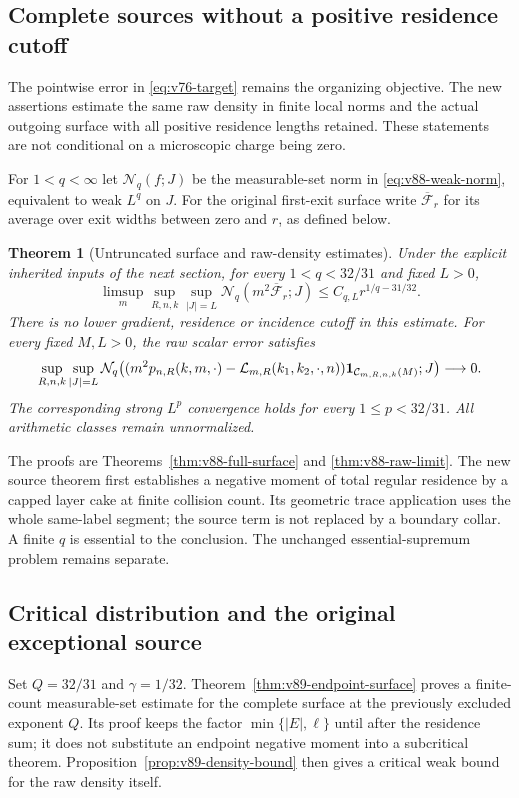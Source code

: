 \documentclass[11pt,reqno]{amsart}
\numberwithin{equation}{section}
\newtheorem{theorem}{Theorem}[section]
\theoremstyle{definition}\newtheorem{definition}[theorem]{Definition}
\theoremstyle{remark}\newtheorem{remark}[theorem]{Remark}
\theoremstyle{definition}\newtheorem{inputstatement}[theorem]{Input statement}
\begin{document}


\subsection{Complete sources without a positive residence cutoff}
The pointwise error in \eqref{eq:v76-target} remains the organizing
objective. The new assertions estimate the same raw density in finite
local norms and the actual outgoing surface with all positive residence
lengths retained. These statements are not conditional on a microscopic
charge being zero.

For $1<q<\infty$ let $\mathcal N_q(f;J)$ be the measurable-set norm
in \eqref{eq:v88-weak-norm}, equivalent to weak $L^q$ on $J$.
For the original first-exit surface write $\overline{\mathcal F}_r$
for its average over exit widths between zero and $r$, as defined below.
\begin{theorem}[Untruncated surface and raw-density estimates]
\label{thm:v88-main}
Under the explicit inherited inputs of the next section, for every
$1<q<32/31$ and fixed $L>0$,
\[
 \limsup_m\sup_{R,n,k}\sup_{|J|=L}
 \mathcal N_q(m^2\overline{\mathcal F}_r;J)
                      \le C_{q,L}r^{1/q-31/32}.
\]
There is no lower gradient, residence or incidence cutoff in this
estimate. For every fixed $M,L>0$, the raw scalar error satisfies
\[
 \sup_{R,n,k}\sup_{|J|=L}
 \mathcal N_q\!\left(
 (m^2p_{n,R}(k,m,\cdot)-\mathcal L_{m,R}(k_1,k_2,\cdot,n))
 \mathbf1_{\mathcal C_{m,R,n,k}(M)};J\right)\longrightarrow0.
\]
The corresponding strong $L^p$ convergence holds for every
$1\le p<32/31$. All arithmetic classes remain unnormalized.
\end{theorem}
The proofs are Theorems~\ref{thm:v88-full-surface} and
\ref{thm:v88-raw-limit}. The new source theorem first establishes a
negative moment of total regular residence by a capped layer cake at
finite collision count. Its geometric trace application uses the
whole same-label segment; the source term is not replaced by a
boundary collar. A finite $q$ is essential to the conclusion. The
unchanged essential-supremum problem remains separate.

\subsection{Critical distribution and the original exceptional source}
Set $Q=32/31$ and $\gamma=1/32$. Theorem~\ref{thm:v89-endpoint-surface}
proves a finite-count measurable-set estimate for the complete surface
at the previously excluded exponent $Q$. Its proof keeps the factor
$\min\{|E|,\ell\}$ until after the residence sum; it does not
substitute an endpoint negative moment into a subcritical theorem.
Proposition~\ref{prop:v89-density-bound} then gives a critical weak
bound for the raw density itself.
\end{document}
